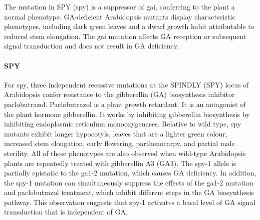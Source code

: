 \documentclass[10pt,a4paper]{article}
\begin{document}
The mutation in SPY (spy) is a suppressor of gai, conferring to the plant a normal phenotype. 
GA-deficient Arabidopsis mutants display characteristic phenotypes, including dark green leaves 
and a dwarf growth habit attributable to reduced stem elongation\cite{peng_arabidopsis_1997}.
The gai mutation affects GA reception or subsequent signal transduction and does not result in GA deficiency\cite{hooley_gibberellins:_nodate}.







\paragraph{SPY}
For spy, three independent recessive mutations at the SPINDLY (SPY) locus of Arabidopsis confer resistance to the gibberellin (GA) biosynthesis inhibitor paclobutrazol. Paclobutrazol is a plant growth retardant. It is an antagonist of the plant hormone gibberellin. It works by inhibiting gibberellin biosynthesis by inhibiting endoplasmic reticulum monooxygenases. Relative to wild type, spy mutants exhibit longer hypocotyls, leaves that are a lighter green colour, increased stem elongation, early flowering, parthenocarpy, and partial male sterility. All of these phenotypes are also observed when wild-type Arabidopsis plants are repeatedly treated with gibberellin A3 (GA3). The spy-1 allele is partially epistatic to the ga1-2 mutation, which causes GA deficiency. In addition, the spy-1 mutation can simultaneously suppress the effects of the ga1-2 mutation and paclobutrazol treatment, which inhibit different steps in the GA biosynthesis pathway. This observation suggests that spy-1 activates a basal level of GA signal transduction that is independent of GA\cite{lee_gibberellin_2002}.


\end{document}
